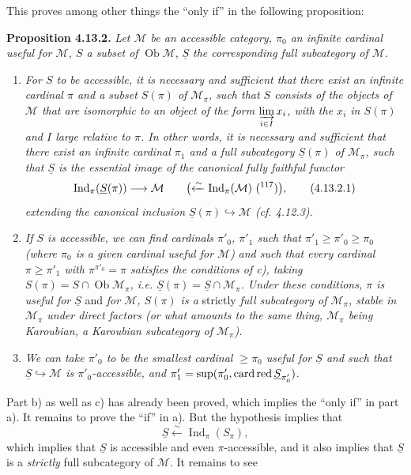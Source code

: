 \documentclass[11pt]{article}
\newcommand{\printedpage}[1]{\marginpar{\footnotesize p.~#1}}
\newcommand{\msp}[1]{\marginpar{\footnotesize [#1]}}
\newcommand{\M}{\mathcal{M}}
\newcommand{\Ind}{\operatorname{Ind}}
\newcommand{\Ob}{\operatorname{Ob}}
\newcommand{\card}{\operatorname{card}}
\newcommand{\red}{\mathop{\textup{red}}\nolimits}
\newcommand{\uS}{\underline{S}}
\begin{document}
This proves among other things the ``only if'' in the following proposition:

\textbf{Proposition 4.13.2.} \textit{Let $\M$ be an accessible category, $\pi_0$ an infinite cardinal useful for $\M$, $S$ a subset of} $\Ob\M$, \textit{$\uS$ the corresponding full subcategory of $\M$.}

\msp{page 284}
\begin{enumerate}
\item[\textit{a)}] \textit{For $S$ to be accessible, it is necessary and sufficient that there exist an infinite cardinal $\pi$ and a subset $S(\pi)$ of $\M_\pi$, such that $S$ consists of the objects of $\M$ that are isomorphic to an object of the form $\varinjlim\limits_{i\in I} x_i$, with the $x_i$ in $S(\pi)$ and $I$ large relative to $\pi$. In other words, it is necessary and sufficient that there exist an infinite cardinal $\pi_1$ and a full subcategory %
$\uS(\pi)$ of $\M_\pi$, such that $\uS$ is the essential image of the canonical fully faithful functor}
\[
\Ind_\pi(\uS(\pi)) \longrightarrow \M \qquad \bigl(\xleftarrow{\sim} \Ind_\pi(\M)\ \text{(\footnotemark[117])}\bigr) , \tag*{(4.13.2.1)} %
\]
\footnotetext[117]{if $\pi$ useful for $\M$.}
\textit{extending the canonical inclusion $\uS(\pi) \hookrightarrow \M$ (cf. 4.12.3).}
\item[\textit{b)}] \printedpage{106}
\textit{If $S$ is accessible, we can find cardinals $\pi'_0$, $\pi'_1$ such that $\pi'_1 \geqslant \pi'_0 \geqslant \pi_0$ (where $\pi_0$ is a given cardinal useful for $\M$)}
\msp{page 285}
\textit{and such that every cardinal $\pi \geqslant \pi'_1$ with $\pi^{\pi'_0} = \pi$ satisfies the conditions of c), taking $S(\pi) = S \cap \Ob\M_\pi$, i.e. $\uS(\pi) = \uS \cap \M_\pi$. Under these conditions, $\pi$ is useful for $\uS$} and \textit{for $\M$, $S(\pi)$ is a} strictly \textit{full subcategory of $\M_\pi$, stable in $\M_\pi$ under direct factors (or what amounts to the same thing, $\M_\pi$ being Karoubian, a Karoubian subcategory of $\M_\pi$).}
\item[\textit{c)}] \textit{We can take $\pi'_0$ to be the smallest cardinal $\geqslant \pi_0$ useful for $\uS$ and such that $\uS \hookrightarrow \M$ is $\pi'_0$-accessible, and $\pi'_1 = \sup(\pi'_0, \card\red\uS_{\pi'_0})$.}
\end{enumerate}

Part b) as well as c) has already been proved, which implies the ``only if'' in part a). It remains to prove the ``if'' in a). But the hypothesis implies that
\[
\uS \xleftarrow{\sim} \Ind_\pi(S_\pi) ,
\]
which implies that $\uS$ is accessible and even $\pi$-accessible, and it also implies that $\uS$ is a \textit{strictly} full subcategory of $\M$. It remains to see
\end{document}

